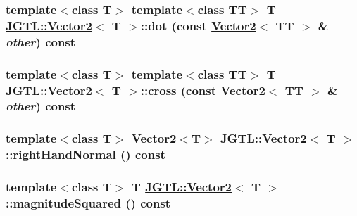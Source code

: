 \hypertarget{class_j_g_t_l_1_1_vector2_7da1f1c271b82459db66308d1b7357f8}{
\subsubsection[dot]{\setlength{\rightskip}{0pt plus 5cm}template$<$class T$>$ template$<$class TT$>$ T \hyperlink{class_j_g_t_l_1_1_vector2}{JGTL::Vector2}$<$ T $>$::dot (const \hyperlink{class_j_g_t_l_1_1_vector2}{Vector2}$<$ TT $>$ \& {\em other}) const}}
\label{class_j_g_t_l_1_1_vector2_7da1f1c271b82459db66308d1b7357f8}


\hypertarget{class_j_g_t_l_1_1_vector2_833c8e2a0ce884794fa7eaf3f163428b}{
\subsubsection[cross]{\setlength{\rightskip}{0pt plus 5cm}template$<$class T$>$ template$<$class TT$>$ T \hyperlink{class_j_g_t_l_1_1_vector2}{JGTL::Vector2}$<$ T $>$::cross (const \hyperlink{class_j_g_t_l_1_1_vector2}{Vector2}$<$ TT $>$ \& {\em other}) const}}
\label{class_j_g_t_l_1_1_vector2_833c8e2a0ce884794fa7eaf3f163428b}


\hypertarget{class_j_g_t_l_1_1_vector2_912a0b6ebadfb974d944cb7cdb9d9c47}{
\subsubsection[rightHandNormal]{\setlength{\rightskip}{0pt plus 5cm}template$<$class T$>$ \hyperlink{class_j_g_t_l_1_1_vector2}{Vector2}$<$T$>$ \hyperlink{class_j_g_t_l_1_1_vector2}{JGTL::Vector2}$<$ T $>$::right\-Hand\-Normal () const}}
\label{class_j_g_t_l_1_1_vector2_912a0b6ebadfb974d944cb7cdb9d9c47}


\hypertarget{class_j_g_t_l_1_1_vector2_6ae70676b52a3c036872898b84c68e22}{
\subsubsection[magnitudeSquared]{\setlength{\rightskip}{0pt plus 5cm}template$<$class T$>$ T \hyperlink{class_j_g_t_l_1_1_vector2}{JGTL::Vector2}$<$ T $>$::magnitude\-Squared () const}}
\label{class_j_g_t_l_1_1_vector2_6ae70676b52a3c036872898b84c68e22}


